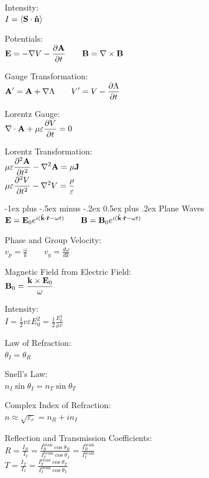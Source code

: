 \documentclass[12pt,landscape]{article}
\makeatletter
\renewcommand{\section}{\@startsection{section}{1}{0mm}%
                                {-1ex plus -.5ex minus -.2ex}%
                                {0.5ex plus .2ex}%
                                {\normalfont\normalsize\bfseries}}
\newcommand{\tab}{\hspace{.02\textwidth}}
\newcommand{\ds}{\displaystyle}
\renewcommand{\dv}[2]{\frac{d#1}{d#2}}
\renewcommand{\grad}{\nabla}
\renewcommand{\curl}[1]{\nabla\times#1}
\renewcommand{\div}[1]{\nabla\cdot#1}
\renewcommand{\cross}{\times}
\makeatother
\begin{document}
\begin{multicols}{3}
Intensity:\\
\tab $I = \langle \vb{S}\cdot\vu{n}\rangle$

Potentials:\\
\tab $\ds \vb{E} = -\grad{V} - \pdv{\vb{A}}{t} \qquad \vb{B} = \curl{\vb{B}}$

Gauge Transformation:\\
\tab $\ds \vb{A^\prime} = \vb{A} + \grad{\Lambda} \qquad V^\prime = V - \pdv{\Lambda}{t}$

Lorentz Gauge:\\
\tab $\ds \div{\vb{A}} + \mu\varepsilon\pdv{V}{t} = 0$

Lorentz Transformation:\\
\tab $\ds \mu\varepsilon\pdv[2]{\vb{A}}{t} - \laplacian{\vb{A}} = \mu\vb{J}$\\
\tab $\ds \mu\varepsilon\pdv[2]{V}{t} - \laplacian{V} = \frac{\rho}{\varepsilon}$

\section{Plane Waves}
$\vb{E} = \vb{E}_0e^{i(\vu{k}\cdot\vu{r} - \omega t)} \qquad \vb{B} = \vb{B}_0e^{i(\vu{k}\cdot\vu{r} - \omega t)}$

Phase and Group Velocity:\\
\tab $\ds v_p = \frac{\omega}{k} \qquad \ds v_g = \dv{\omega}{k}$

\columnbreak

Magnetic Field from Electric Field:\\
\tab $\ds \vb{B}_0 = \frac{\vb{k}\cross\vb{E}_0}{\omega}$

Intensity:\\
\tab $\ds I = \frac{1}{2}v\varepsilon E_0^2 = \frac{1}{2}\frac{E_0^2}{\mu v}$

Law of Refraction:\\
\tab $\theta_I = \theta_R$

Snell's Law:\\
\tab $n_I \sin\theta_I = n_T\sin\theta_T$

Complex Index of Refraction:\\
\tab $\ds n \approx \sqrt{\varepsilon_r} = n_R + in_I$

Reflection and Transmission Coefficients:\\
\tab $\ds R = \frac{I_R}{I_I} = \frac{I^\text{beam}_R\cos\theta_R}{I^\text{beam}_I\cos\theta_I} =\frac{I^\text{beam}_R}{I^\text{beam}_I}$\\
\tab $\ds T = \frac{I_T}{I_I} = \frac{I^\text{beam}_T\cos\theta_T}{I^\text{beam}_I\cos\theta_I}$


\end{multicols}
\end{document}

